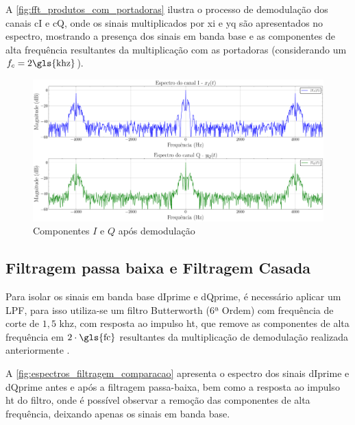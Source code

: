A \autoref{fig:fft_produtos_com_portadoras} ilustra o processo de demodulação dos canais \gls{cI} e \gls{cQ}, onde os sinais multiplicados por \gls{xi} e \gls{yq} são apresentados no espectro, mostrando a presença dos sinais em banda base e as componentes de alta frequência resultantes da multiplicação com as portadoras (considerando um $f_c = 2 \text{\gls{khz}}$). \cite{cnes_services_and_message_formats_ed2_rev2_2006}

\begin{figure}[H]
	\centering
	\caption{Componentes $I$ e $Q$ após demodulação}\label{fig:fft_produtos_com_portadoras}
	\includegraphics[width=\linewidth]{assets/fft_produtos_com_portadoras.pdf}
\end{figure}


\subsection{Filtragem passa baixa e Filtragem Casada}

Para isolar os sinais em banda base \gls{dIprime} e \gls{dQprime}, é necessário aplicar um \gls{LPF}, para isso utiliza-se um filtro Butterworth (6ª Ordem) com frequência de corte de $1,5$ \gls{khz}, com resposta ao impulso \gls{ht}, que remove as componentes de alta frequência em $2 \cdot \text{\gls{fc}}$ resultantes da multiplicação de demodulação realizada anteriormente \cite{rodrigues_demodulador_2018}.

A \autoref{fig:espectros_filtragem_comparacao} apresenta o espectro dos sinais \gls{dIprime} e \gls{dQprime} antes e após a filtragem passa-baixa, bem como a resposta ao impulso \gls{ht} do filtro, onde é possível observar a remoção das componentes de alta frequência, deixando apenas os sinais em banda base.

